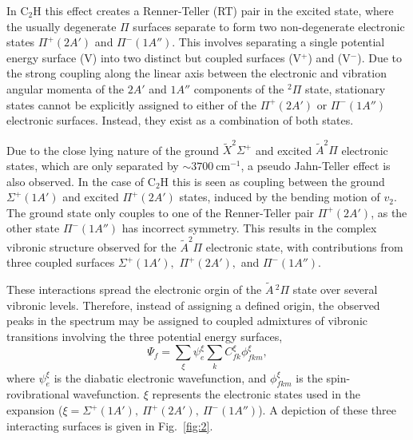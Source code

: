 \documentclass[journal=jpcafh,manuscript=article,layout=onecolumn, 12pt]{achemso}
\begin{document}
In C$_2$H this effect creates a Renner-Teller (RT) pair in the excited state, where the usually degenerate $\Pi$ surfaces separate to form two non-degenerate electronic states $\Pi^+ (2A')$ and $\Pi^-(1A'')$. This involves separating a single potential energy surface (V) into two distinct but coupled surfaces (V$^+$) and (V$^-$). Due to the strong coupling along the linear axis between the electronic and vibration angular momenta of the $2A'$ and $1A''$ components of the $^2\Pi$ state, stationary states cannot be explicitly assigned to either of the $\Pi^+(2A')$ or $\Pi^-(1A'')$ electronic surfaces. Instead, they exist as a combination of both states.

Due to the close lying nature of the ground {$\tilde{X} ^2\Sigma^+$} and excited {$\tilde{A} ^2\Pi$} electronic states, which are only separated by $\sim3700~$cm$^{-1}$, a pseudo Jahn-Teller effect is also observed. %
In the case of C$_2$H this is seen as coupling between the ground $\Sigma^+(1A')$ and excited $\Pi^+(2A')$ states, induced by the bending motion of $v_2$. The ground state only couples to one of the Renner-Teller pair $\Pi^+(2A')$, as the other state $\Pi^-(1A'')$ has incorrect symmetry. This results in the complex vibronic structure observed for the $\tilde{A}^2\Pi$ electronic state, with contributions from three coupled surfaces $\Sigma^+(1A'),$ $\Pi^+(2A'),$ and $\Pi^-(1A'')$.

These interactions spread the electronic orgin of the $\tilde{A}\,^2\Pi$ state over several vibronic levels. Therefore, instead of assigning a defined origin, the observed peaks in the spectrum may be assigned to coupled admixtures of vibronic transitions involving the three potential energy surfaces,
\begin{equation}
\Psi_f = \sum_\xi \psi_e^\xi \sum_k C_{fk}^\xi\phi_{fkm}^\xi,
\label{eq:teller3} 
\end{equation}
where $\psi_e^\xi$ is the diabatic electronic wavefunction, and $\phi_{fkm}^\xi$ is the spin-rovibrational wavefunction. $\xi$ represents the electronic states used in the expansion ($\xi=\Sigma^+(1A'),~\Pi^+(2A'),~\Pi^-(1A'')$). A depiction of these three interacting surfaces is given in Fig.~\ref{fig:2}.
\end{document}
